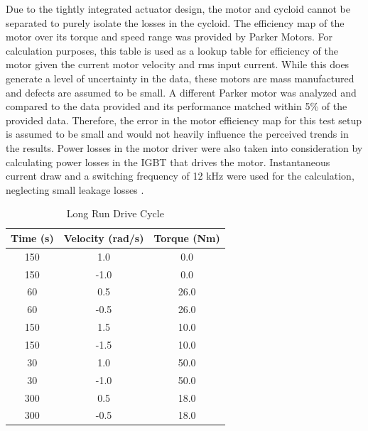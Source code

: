 Due to the tightly integrated actuator design, the motor and cycloid cannot be separated to purely isolate the losses in the cycloid.
The efficiency map of the motor over its torque and speed range was provided by Parker Motors.
For calculation purposes, this table is used as a lookup table for efficiency of the motor given the current motor velocity and rms input current.
While this does generate a level of uncertainty in the data, these motors are mass manufactured and defects are assumed to be small.
A different Parker motor was analyzed and compared to the data provided and its performance matched within 5\% of the provided data. Therefore, the error in the motor efficiency map for this test setup is assumed to be small and would not heavily influence the perceived trends in the results.
Power losses in the motor driver were also taken into consideration by calculating power losses in the IGBT that drives the motor.
Instantaneous current draw and a switching frequency of 12 kHz were used for the calculation, neglecting small leakage losses \cite{IGBTPower}.

\begin{table}[t]
	\vskip0.2cm
	\caption{Long Run Drive Cycle}
	\label{table_2}
	\begin{center}
		\vskip-0.2cm
		\begin{tabular}{|c||c||c|}
			\hline
			Time (s) & Velocity (rad/s) & Torque (Nm)\\
			\hline
			150 & 1.0 & 0.0\\
			\hline
			150 & -1.0 & 0.0\\
			\hline
			60 & 0.5 & 26.0\\
			\hline
			60 & -0.5 & 26.0\\
			\hline
			150 & 1.5 & 10.0\\
			\hline
			150 & -1.5 & 10.0\\
			\hline
			30 & 1.0 & 50.0\\
			\hline
			30 & -1.0 & 50.0\\
			\hline
			300 & 0.5 & 18.0\\
			\hline
			300 & -0.5 & 18.0\\
			\hline
		\end{tabular}
	\end{center}
\end{table}


